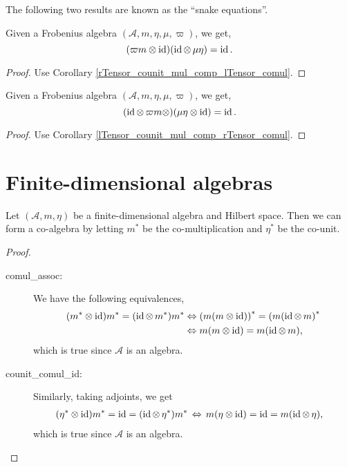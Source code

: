  The following two results are known as the ``snake equations''.
 \begin{corollary}\label{rTensor_counit_mul_comp_lTensor_comul_unit}
  \leanok
  Given a Frobenius algebra $(\mathcal{A},m,\eta,\mu,\varpi)$, we get,
  \[(\varpi m\otimes\operatorname{id})(\operatorname{id}\otimes\,\mu\eta)=\operatorname{id}.\]
 \end{corollary}
 \begin{proof}\leanok
  Use Corollary \ref{rTensor_counit_mul_comp_lTensor_comul}.
 \end{proof}
 \begin{corollary}\label{lTensor_counit_mul_comp_rTensor_comul_unit}
  \leanok
  Given a Frobenius algebra $(\mathcal{A},m,\eta,\mu,\varpi)$, we get,
  \[(\operatorname{id}\otimes\,\varpi m\otimes)(\mu\eta\otimes\operatorname{id})=\operatorname{id}.\]
 \end{corollary}
 \begin{proof}\leanok
  Use Corollary \ref{lTensor_counit_mul_comp_rTensor_comul}.
 \end{proof}

\section{Finite-dimensional algebras}
 
 \begin{proposition}\label{Coalgebra.ofFiniteDimensionalHilbertAlgebra}
  \leanok
  Let $(\mathcal{A},m,\eta)$ be a finite-dimensional algebra and Hilbert space. Then we can form a co-algebra by letting $m^*$ be the co-multiplication and $\eta^*$ be the co-unit.
 \end{proposition}
 \begin{proof}\leanok {\ }
  \begin{description}
   \item[comul\_assoc:]
    We have the following equivalences,
    \begin{align*}
      (m^*\otimes\operatorname{id})m^*=(\operatorname{id}\otimes\,m^*)m^* &\Leftrightarrow {(m(m\otimes\operatorname{id}))}^*={(m(\operatorname{id}\otimes\,m)}^*\\
      &\Leftrightarrow m(m\otimes\operatorname{id})=m(\operatorname{id}\otimes\,m),
    \end{align*}
    which is true since $\mathcal{A}$ is an algebra.
   \item[counit\_comul\_id:]
    Similarly, taking adjoints, we get
    \begin{align*}
     &\, (\eta^*\otimes\operatorname{id})m^*=\operatorname{id}=(\operatorname{id}\otimes\,\eta^*)m^*
     \,\Leftrightarrow\, m(\eta\otimes\operatorname{id})=\operatorname{id}=m(\operatorname{id}\otimes\,\eta),
    \end{align*}
    which is true since $\mathcal{A}$ is an algebra.
  \end{description}
 \end{proof}
 
